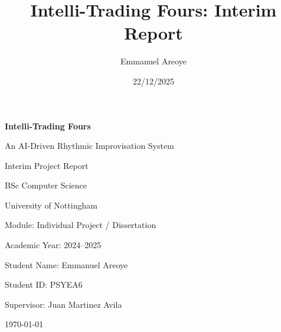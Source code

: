 \documentclass[11pt,a4paper]{article}
\title{Intelli-Trading Fours: Interim Report}
\author{Emmanuel Areoye}
\date{22/12/2025}
\begin{document}

\begin{titlepage}
    \centering
    \vspace*{3cm}

    {\Large\bfseries Intelli-Trading Fours\par}
    \vspace{0.5cm}
    {\large An AI-Driven Rhythmic Improvisation System\par}

    \vspace{2.5cm}

    {\large Interim Project Report\par}
    \vspace{0.5cm}

    {\large BSc Computer Science\par}
    \vspace{0.25cm}
    {\large University of Nottingham\par}

    \vspace{2cm}

    {\large Module: Individual Project / Dissertation\par}
    \vspace{0.25cm}
    {\large Academic Year: 2024--2025\par}

    \vspace{2cm}

    {\large Student Name: Emmanuel Areoye\par}
    \vspace{0.25cm}
    {\large Student ID: PSYEA6\par}

    \vfill

    {\large Supervisor: Juan Martinez Avila\par}
    \vspace{0.5cm}
    {\large \today\par}
\end{titlepage}


\setcounter{page}{1}

\maketitle
\vspace{-1.2em}
\end{document}
